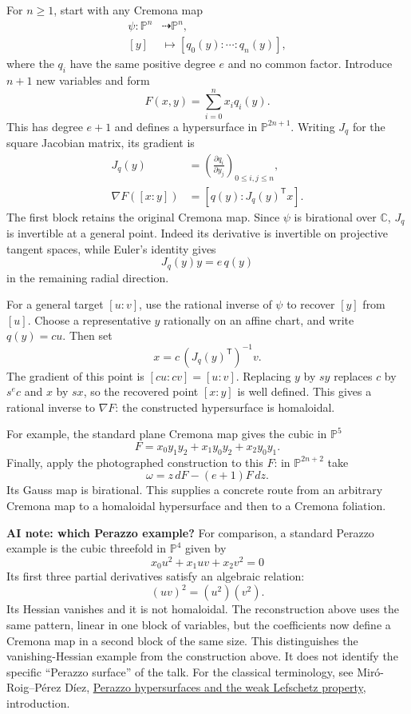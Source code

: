 For $n\geq1$, start with any Cremona map
$$
\begin{aligned}
\psi:\mathbb{P}^n&\dashrightarrow
\mathbb{P}^n,\\
[y]&\longmapsto
[q_0(y):\cdots:q_n(y)],
\end{aligned}
$$
where the $q_i$ have the same positive
degree $e$ and no common factor.
Introduce $n+1$ new variables and form
$$
F(x,y)=\sum_{i=0}^n x_iq_i(y).
$$
This has degree $e+1$ and defines a
hypersurface in $\mathbb{P}^{2n+1}$.
Writing $J_q$ for the square Jacobian
matrix, its gradient is
$$
\begin{aligned}
J_q(y)&=
\left(\frac{\partial q_i}
{\partial y_j}\right)_{0\leq i,j\leq n},\\
\nabla F([x:y])&=
[q(y):J_q(y)^{\mathsf T}x].
\end{aligned}
$$
The first block retains the original
Cremona map. Since $\psi$ is birational
over $\mathbb{C}$, $J_q$ is invertible
at a general point. Indeed its derivative
is invertible on projective tangent
spaces, while Euler's identity gives
$$
J_q(y)y=e\,q(y)
$$
in the remaining radial direction.

For a general target $[u:v]$, use the
rational inverse of $\psi$ to recover
$[y]$ from $[u]$. Choose a representative
$y$ rationally on an affine chart, and
write $q(y)=c u$. Then set
$$
x=c\,(J_q(y)^{\mathsf T})^{-1}v.
$$
The gradient of this point is
$[c u:c v]=[u:v]$. Replacing $y$ by
$s y$ replaces $c$ by $s^e c$ and $x$
by $s x$, so the recovered point
$[x:y]$ is well defined.
This gives a rational inverse to
$\nabla F$: the constructed hypersurface
is homaloidal.

For example, the standard plane Cremona
map gives the cubic in $\mathbb{P}^5$
$$
F=x_0y_1y_2+x_1y_0y_2+x_2y_0y_1.
$$
Finally, apply the photographed
construction to this $F$: in
$\mathbb{P}^{2n+2}$ take
$$
\omega=z\,dF-(e+1)F\,dz.
$$
Its Gauss map is birational. This supplies
a concrete route from an arbitrary
Cremona map to a homaloidal hypersurface
and then to a Cremona foliation.

\medskip\noindent
\textbf{AI note: which Perazzo example?}
For comparison, a standard Perazzo
example is the cubic threefold in
$\mathbb{P}^4$ given by
$$
x_0u^2+x_1uv+x_2v^2=0
$$
Its first three partial derivatives
satisfy an algebraic relation:
$$
(uv)^2=(u^2)(v^2).
$$
Its Hessian vanishes and it is not
homaloidal. The reconstruction above
uses the same pattern, linear in one
block of variables, but the coefficients
now define a Cremona map in a second
block of the same size.
This distinguishes the vanishing-Hessian
example from the construction above.
It does not identify the specific
``Perazzo surface'' of the talk.
For the classical terminology, see
Miró-Roig--Pérez Díez,
\href{https://arxiv.org/abs/2402.09188}
{Perazzo hypersurfaces and the weak
Lefschetz property}, introduction.

